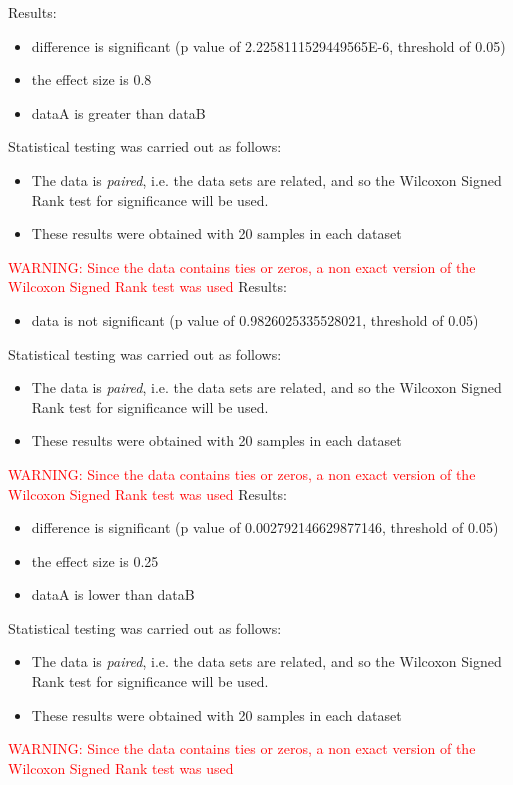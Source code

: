 \documentclass[]{article}
\begin{document}
Results:
\begin{itemize}
\item{difference is significant (p value of 2.2258111529449565E-6, threshold of 0.05)}
\item{the effect size is 0.8}
\item{dataA is greater than dataB}
\end{itemize}Statistical testing was carried out as follows: \begin{itemize}
\item{The data is \textit{paired}, i.e. the data sets are related, and so the Wilcoxon Signed Rank test for significance will be used.}
\item{These results were obtained with 20 samples in each dataset}
\end{itemize}
\textcolor{Red}{WARNING: Since the data contains ties or zeros, a non exact version of the Wilcoxon Signed Rank test was used
}
Results:
\begin{itemize}
\item{data is not significant (p value of 0.9826025335528021, threshold of 0.05)}
\end{itemize}Statistical testing was carried out as follows: \begin{itemize}
\item{The data is \textit{paired}, i.e. the data sets are related, and so the Wilcoxon Signed Rank test for significance will be used.}
\item{These results were obtained with 20 samples in each dataset}
\end{itemize}
\textcolor{Red}{WARNING: Since the data contains ties or zeros, a non exact version of the Wilcoxon Signed Rank test was used
}
Results:
\begin{itemize}
\item{difference is significant (p value of 0.002792146629877146, threshold of 0.05)}
\item{the effect size is 0.25}
\item{dataA is lower than dataB}
\end{itemize}Statistical testing was carried out as follows: \begin{itemize}
\item{The data is \textit{paired}, i.e. the data sets are related, and so the Wilcoxon Signed Rank test for significance will be used.}
\item{These results were obtained with 20 samples in each dataset}
\end{itemize}
\textcolor{Red}{WARNING: Since the data contains ties or zeros, a non exact version of the Wilcoxon Signed Rank test was used
}
\end{document}
